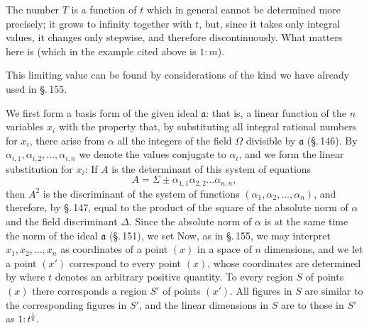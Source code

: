 The number $T$ is a function of $t$ which in general cannot be
 determined more precisely; it grows to infinity together with $t$,
but, since it takes only integral values, it changes only
stepwise, and therefore discontinuously. What matters here is
 (which in the example cited
 above is $1:m$).

This limiting value can be found by considerations of the kind
we have already used in \S.\,155.

We first form a basis form of the given ideal $\mathfrak{a}$:
that is, a linear function of the $n$ variables $x_i$ with the property
that, by substituting all integral rational numbers for
$x_i$, there arise from $\alpha$ all the integers of the field $\Omega$ divisible by $\mathfrak{a}$
 (\S.\,146). By $\alpha_{i,1}, \alpha_{i,2}, \ldots, \alpha_{i,n}$ we denote the values conjugate
to $\alpha_i$, and we form the linear substitution for $x_i$:
If $A$ is the determinant of this system of equations
\[
A = \Sigma \pm \alpha_{1,1} \alpha_{2,2} \ldots \alpha_{n,n},
\]
then $A^2$ is the discriminant of the system of functions $(\alpha_1, \alpha_2, \ldots, \alpha_n)$,
and therefore, by \S.\,147, equal to the product of the square
of the absolute norm of $\alpha$ and the field discriminant $\Delta$.
Since the absolute norm of $\alpha$ is at the same time the norm of the ideal $\mathfrak{a}$
(\S.\,151), we set
Now, as in \S.\,155, we may interpret $x_1, x_2, \ldots, x_n$ as
coordinates of a point $(x)$ in a space of $n$ dimensions,
 and we let a point $(x')$ correspond to every point $(x)$,
whose coordinates are determined by
where $t$ denotes an arbitrary positive quantity.
To every region $S$ of points $(x)$ there corresponds a region $S'$ of
points $(x')$. All figures in $S$ are similar to the corresponding figures
in $S'$, and the linear dimensions in $S$ are to
those in $S'$ as $1 : t^{\frac{1}{n}}$.
